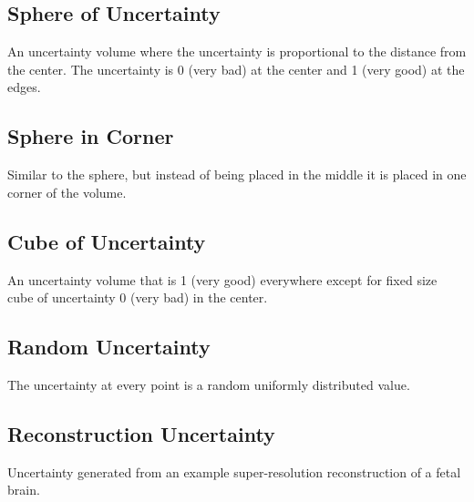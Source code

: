 \subsection*{Sphere of Uncertainty}
An uncertainty volume where the uncertainty is proportional to the distance from the center. The uncertainty is 0 (very bad) at the center and 1 (very good) at the edges.

\subsection*{Sphere in Corner}
Similar to the sphere, but instead of being placed in the middle it is placed in one corner of the volume.

\subsection*{Cube of Uncertainty}
An uncertainty volume that is 1 (very good) everywhere except for fixed size cube of uncertainty 0 (very bad) in the center.

\subsection*{Random Uncertainty}
The uncertainty at every point is a random uniformly distributed value.

\subsection*{Reconstruction Uncertainty}
Uncertainty generated from an example super-resolution reconstruction of a fetal brain.\\

